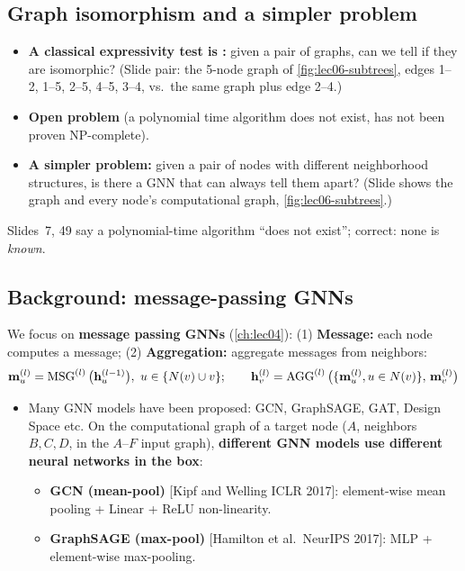 \subsection{Graph isomorphism and a simpler problem}\label{sec:lec06-iso}

\begin{itemize}
  \item \textbf{A classical expressivity test is :} given a
    pair of graphs, can we tell if they are isomorphic? (Slide pair: the 5-node
    graph of \cref{fig:lec06-subtrees}, edges 1--2, 1--5, 2--5, 4--5, 3--4, vs.\
    the same graph plus edge 2--4.)
  \item \textbf{Open problem} (a polynomial time algorithm does not exist, has
    not been proven NP-complete).
  \item \textbf{A simpler problem:} given a pair of nodes with different
    neighborhood structures, is there a GNN that can always tell them apart?
    (Slide shows the graph and every node's computational graph,
    \cref{fig:lec06-subtrees}.)
\end{itemize}
\begin{caution}
  Slides~7, 49 say a polynomial-time algorithm ``does not exist''; correct: none
  is \emph{known}.
\end{caution}

\subsection{Background: message-passing GNNs}\label{sec:lec06-background}
\slides{9--12}

We focus on \textbf{message passing GNNs} (\cref{ch:lec04}): (1)
\textbf{Message:} each node computes a message; (2) \textbf{Aggregation:}
aggregate messages from neighbors:
\begin{equation}\label{eq:lec06-msgagg}
  \mathbf{m}_u^{(l)} = \operatorname{MSG}^{(l)}\big(\mathbf{h}_u^{(l-1)}\big),\ u\in\{N(v)\cup v\};
  \qquad
  \mathbf{h}_v^{(l)} = \operatorname{AGG}^{(l)}\big(\{\mathbf{m}_u^{(l)}, u\in N(v)\},\,\mathbf{m}_v^{(l)}\big)
\end{equation}
\begin{itemize}
  \item Many GNN models have been proposed: GCN, GraphSAGE, GAT, Design Space
    etc. On the computational graph of a target node ($A$, neighbors $B,C,D$, in
    the $A$--$F$ input graph), \textbf{different GNN models use different neural
    networks in the box}:
    \begin{itemize}
      \item \textbf{GCN (mean-pool)} [Kipf and Welling ICLR 2017]: element-wise
        mean pooling + Linear + ReLU non-linearity.
      \item \textbf{GraphSAGE (max-pool)} [Hamilton et al.\ NeurIPS 2017]: MLP +
        element-wise max-pooling.
    \end{itemize}
\end{itemize}

